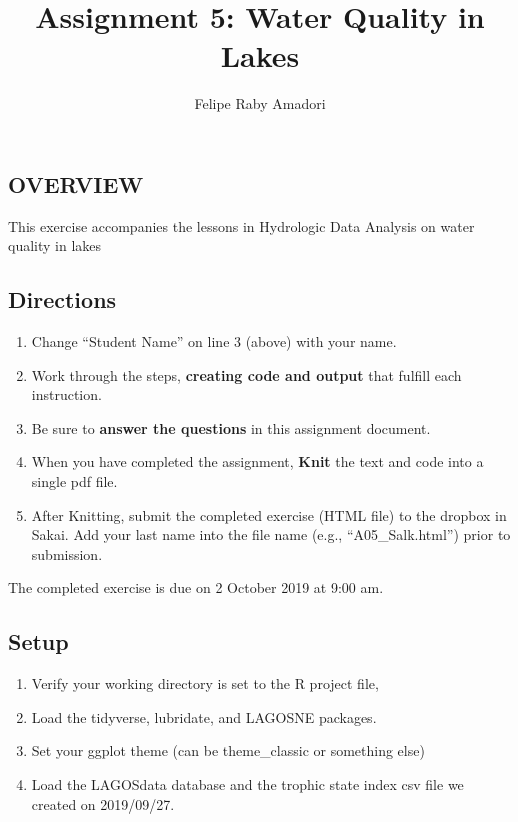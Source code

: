 \documentclass[]{article}
\title{Assignment 5: Water Quality in Lakes}
\author{Felipe Raby Amadori}
\date{}
\providecommand{\tightlist}{%
  \setlength{\itemsep}{0pt}\setlength{\parskip}{0pt}}
\begin{document}
\maketitle

\hypertarget{overview}{%
\subsection{OVERVIEW}\label{overview}}

This exercise accompanies the lessons in Hydrologic Data Analysis on
water quality in lakes

\hypertarget{directions}{%
\subsection{Directions}\label{directions}}

\begin{enumerate}
\def\labelenumi{\arabic{enumi}.}
\tightlist
\item
  Change ``Student Name'' on line 3 (above) with your name.
\item
  Work through the steps, \textbf{creating code and output} that fulfill
  each instruction.
\item
  Be sure to \textbf{answer the questions} in this assignment document.
\item
  When you have completed the assignment, \textbf{Knit} the text and
  code into a single pdf file.
\item
  After Knitting, submit the completed exercise (HTML file) to the
  dropbox in Sakai. Add your last name into the file name (e.g.,
  ``A05\_Salk.html'') prior to submission.
\end{enumerate}

The completed exercise is due on 2 October 2019 at 9:00 am.

\hypertarget{setup}{%
\subsection{Setup}\label{setup}}

\begin{enumerate}
\def\labelenumi{\arabic{enumi}.}
\tightlist
\item
  Verify your working directory is set to the R project file,
\item
  Load the tidyverse, lubridate, and LAGOSNE packages.
\item
  Set your ggplot theme (can be theme\_classic or something else)
\item
  Load the LAGOSdata database and the trophic state index csv file we
  created on 2019/09/27.
\end{enumerate}
\end{document}
